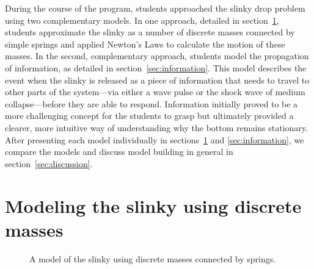 \documentclass[prb,preprint,superscriptaddress]{revtex4-1}
\renewcommand{\sec}[1]{section~\ref{sec:#1}}
\newcommand{\secs}[2]{sections~\ref{sec:#1} and \ref{sec:#2}}
\begin{document}
During the course of the program, students approached the slinky drop problem using two complementary models.
In one approach, detailed in \sec{forces}, students approximate
the slinky as a number of discrete masses connected by simple springs and applied
 Newton's Laws to calculate the motion of these masses.
In the second, complementary
approach, students model the propagation of information, as detailed in \sec{information}. This model
describes the event when the slinky is released as a piece of information that
needs to travel to other parts of the system---via either a wave pulse or the shock wave of medium collapse---before they are able to respond.
Information initially proved to be a more challenging concept for the
students to grasp but ultimately provided a clearer, more intuitive way of understanding why the bottom
remains stationary. After presenting each
model individually in \secs{forces}{information}, we compare the models and
discuss model building in general in \sec{discussion}.

\section{Modeling the slinky using discrete masses}
\label{sec:forces}

\begin{figure}[t]
\centering


\caption{A model of the slinky using discrete masses connected by springs.}
\label{fig:discrete}
\end{figure}
\end{document}
